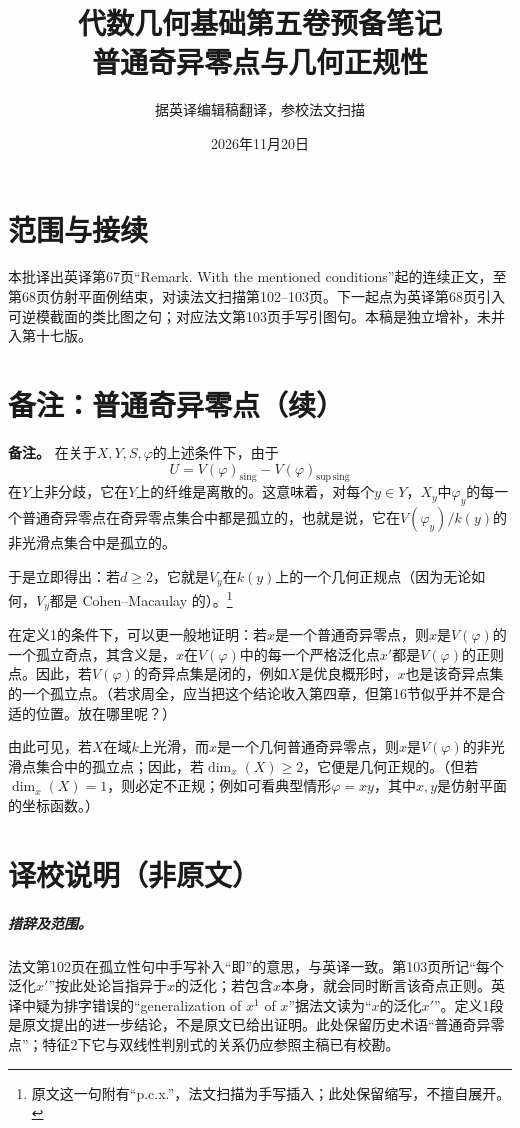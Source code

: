 \documentclass[openany,fontset=fandol]{ctexbook}
\begin{document}
\title{代数几何基础第五卷预备笔记\\普通奇异零点与几何正规性}
\author{据英译编辑稿翻译，参校法文扫描}
\date{2026年11月20日}
\maketitle
\chapter*{范围与接续}
本批译出英译第67页“Remark. With the mentioned conditions”起的连续正文，至第68页仿射平面例结束，对读法文扫描第102--103页。下一起点为英译第68页引入可逆模截面的类比图之句；对应法文第103页手写引图句。本稿是独立增补，未并入第十七版。
\chapter*{备注：普通奇异零点（续）}
\noindent\textbf{备注。}
在关于$X,Y,S,\varphi$的上述条件下，由于
\[
U=V(\varphi)_{\mathrm{sing}}-V(\varphi)_{\mathrm{sup\,sing}}
\]
在$Y$上非分歧，它在$Y$上的纤维是离散的。这意味着，对每个$y\in Y$，$X_y$中$\varphi_y$的每一个普通奇异零点在奇异零点集合中都是孤立的，也就是说，它在$V(\varphi_y)/k(y)$的非光滑点集合中是孤立的。

于是立即得出：若$d\ge 2$，它就是$V_y$在$k(y)$上的一个几何正规点（因为无论如何，$V_y$都是 Cohen--Macaulay 的）。\footnote{原文这一句附有“p.c.x.”，法文扫描为手写插入；此处保留缩写，不擅自展开。}

在定义1的条件下，可以更一般地证明：若$x$是一个普通奇异零点，则$x$是$V(\varphi)$的一个孤立奇点，其含义是，$x$在$V(\varphi)$中的每一个严格泛化点$x'$都是$V(\varphi)$的正则点。因此，若$V(\varphi)$的奇异点集是闭的，例如$X$是优良概形时，$x$也是该奇异点集的一个孤立点。（若求周全，应当把这个结论收入第四章，但第16节似乎并不是合适的位置。放在哪里呢？）

由此可见，若$X$在域$k$上光滑，而$x$是一个几何普通奇异零点，则$x$是$V(\varphi)$的非光滑点集合中的孤立点；因此，若$\dim_x(X)\ge 2$，它便是几何正规的。（但若$\dim_x(X)=1$，则必定不正规；例如可看典型情形$\varphi=xy$，其中$x,y$是仿射平面的坐标函数。）
\chapter*{译校说明（非原文）}
\paragraph{措辞及范围。}
法文第102页在孤立性句中手写补入“即”的意思，与英译一致。第103页所记“每个泛化$x'$”按此处论旨指异于$x$的泛化；若包含$x$本身，就会同时断言该奇点正则。英译中疑为排字错误的“generalization of $x^1$ of $x$”据法文读为“$x$的泛化$x'$”。定义1段是原文提出的进一步结论，不是原文已给出证明。此处保留历史术语“普通奇异零点”；特征$2$下它与双线性判别式的关系仍应参照主稿已有校勘。
\end{document}
